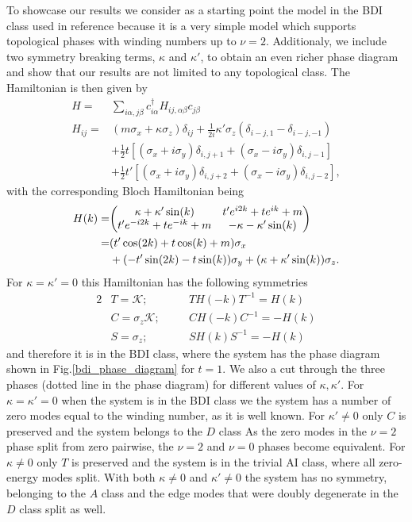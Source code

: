 \documentclass[twocolumn,amsmath,longbibliography,amssymb,superscriptaddress]{revtex4-1}
\begin{document}
To showcase our results we consider as a starting point the model in the BDI class used in reference \cite{Song2014} because it is a very simple model which supports topological phases with winding numbers up to $\nu =2$. Additionaly, we include two symmetry breaking terms, $\kappa$ and $\kappa'$, to obtain an even richer phase diagram and show that our results are not limited to any topological class. The Hamiltonian is then given by
\begin{align}
H =& \sum_{i\alpha,j\beta} c_{i\alpha}^\dagger H_{ij,\alpha \beta} c_{j\beta} \\
H_{ij} =& (m \sigma_x + \kappa \sigma_z)\delta_{ij}  + \frac{1}{2i}\kappa'\sigma_z (\delta_{i-j,1}-\delta_{i-j,-1})\\
&+ \frac{1}{2} t \left[(\sigma_x + i \sigma_y)\delta_{i,j+1} + (\sigma_x - i \sigma_y) \delta_{i,j-1} \right] \\
&+  \frac{1}{2} t' \left[(\sigma_x + i \sigma_y)\delta_{i,j+2} + (\sigma_x - i \sigma_y) \delta_{i,j-2} \right],
\label{bdi_model}
\end{align}
with the corresponding Bloch Hamiltonian being
\begin{align*}
H(k)=&\mqty( \kappa + \kappa' \sin(k) & t' e^{i2k} + t e^{ik}+m \\t' e^{-i2k} + t e^{-ik}+m & -\kappa-\kappa' \sin(k)  ) \\
=& (t' \cos(2k)+t\cos(k)+m)\sigma_x \\
&+ (-t' \sin(2k)-t\sin(k))\sigma_y + (\kappa+\kappa'\sin(k)) \sigma_z.
\end{align*}
For $\kappa = \kappa' = 0$ this Hamiltonian has the following symmetries
\begin{alignat*}{2}
&T = \mathcal{K} ; \quad &&T H(-k) T^{-1} = H(k) \\
&C = \sigma_z\mathcal{K} ; \quad &&C H(-k) C^{-1} = -H(k) \\
&S = \sigma_z ; \quad &&S H(k)S^{-1} = -H(k) 
\end{alignat*}
and therefore it is in the BDI class, where the system has the phase diagram shown in Fig.\ref{bdi_phase_diagram} for $t=1$. We also a cut through the three phases (dotted line in the phase diagram) for different values of $\kappa,\kappa'$.  For $\kappa = \kappa'= 0$ when the system is in the BDI class we the system has a number of zero modes equal to the winding number, as it is well known. For $\kappa' \neq 0$ only $C$ is preserved and the system belongs to the $D$ class As the zero modes in the $\nu=2$ phase split from zero pairwise, the $\nu = 2$ and $\nu=0$ phases become equivalent. For $\kappa \neq 0$ only $T$ is preserved and the system is in the trivial AI class, where all zero-energy modes split. With both $\kappa \neq 0$ and $\kappa' \neq0$ the system has no symmetry, belonging to the $A$ class and the edge modes that were doubly degenerate in the $D$ class split as well. 
\end{document}
